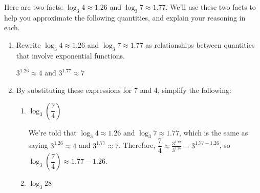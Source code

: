 \documentclass{article}
\begin{document}
\begin{enumerate}

  Here are two facts: $\log_3 4 \approx 1.26$ and $\log_3 7 \approx 1.77$. We'll use these two facts to help you approximate the following quantities, and explain your reasoning in each.

  \begin{enumerate}
  \item 
    \begin{problem}[\vfill]
    Rewrite $\log_3 4 \approx 1.26$ and $\log_3 7 \approx 1.77$ as relationships between quantities that involve exponential functions.
    \end{problem}
    \begin{solution}
        $3^{1.26} \approx 4$ and $3^{1.77}\approx 7$
    \end{solution}
  \item
    \begin{problem}
      By substituting these expressions for 7 and 4, simplify the following: 
      \end{problem}
      \begin{enumerate}
          \item 
          \begin{problem}[\vfill]
          $\log_3 \left( \dfrac{7}{4} \right)$
          \end{problem}
    \begin{solution}      
      We're told that $\log_3 4 \approx 1.26$ and
  $\log_3 7 \approx 1.77$, which is the same as saying $3^{1.26} \approx 4$ and $3^{1.77} \approx 7$. Therefore, $\dfrac{7}{4} \approx \frac{3^{1.77}}{3^{1.26}} = 3^{1.77 - 1.26}$, so $\log_3 \left( \dfrac{7}{4} \right) \approx 1.77 - 1.26$. 
    \end{solution}

  \item
    \begin{problem}[\vfill]
      $\log_3 28$
    \end{problem}


\end{enumerate}
\end{enumerate}
\end{enumerate}
\end{document}
